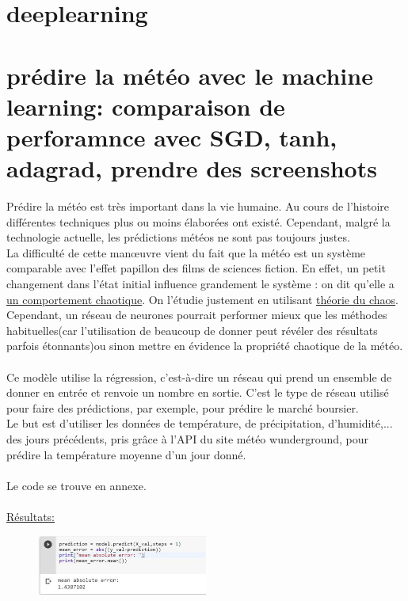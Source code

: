\documentclass[openany,14pt,fleqn]{book} %
\begin{document}
\chapter{deeplearning}
\chapter{prédire la météo avec le machine learning: comparaison de perforamnce avec SGD, tanh, adagrad, prendre des screenshots}
Prédire la météo est très important dans la vie humaine. Au cours de l'histoire différentes techniques plus ou moins élaborées ont existé. Cependant, malgré la technologie actuelle, les prédictions météos ne sont pas toujours justes.\\
La difficulté de cette manœuvre vient du fait que la météo est un système comparable avec l'effet papillon des films de sciences fiction. En effet, un petit changement dans l'état initial influence grandement le système : on dit qu'elle a \underline{ un comportement chaotique}. On l'étudie justement en utilisant \underline{théorie du chaos}.\\
Cependant, un réseau de neurones pourrait performer mieux que les méthodes habituelles(car l'utilisation de beaucoup de donner peut révéler des résultats parfois étonnants)ou sinon mettre en évidence la propriété chaotique de la météo.\cite{chaos}\\\\
Ce modèle utilise la régression, c'est-à-dire un réseau qui prend un ensemble de donner en entrée et renvoie un nombre en sortie. C'est le type de réseau utilisé pour faire des prédictions, par exemple, pour prédire le marché boursier.\\
Le but est d'utiliser les données de température, de précipitation, d'humidité,... des jours précédents, pris grâce à l'API du site météo wunderground, pour prédire la température moyenne d'un jour donné.\\
\cite{weather}\\
Le code se trouve en annexe.\\\\
\underline{Résultats:}
\begin{figure}[h]
    \includegraphics[width=0.5\textwidth]{Pictures/weather error.JPG}
\end{figure}
\end{document}
